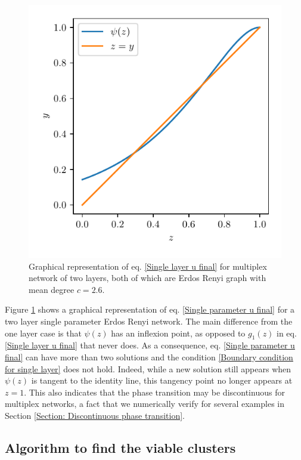 \documentclass[
11pt, %
english, %
singlespacing, %
nolistspacing, %
liststotoc, %
headsepline, %
]{MastersDoctoralThesis} %
\begin{document}
\begin{figure}
	\includegraphics[scale=1]{single_param_u_solution_graphically.pdf}
	\caption{Graphical representation of eq. \eqref{Single layer u final} for multiplex network of two layers, both of which are Erdos Renyi graph with mean degree $c = 2.6$.}
	\label{Figure: Solution of u = psi(u) graphically for single param}
\end{figure}

Figure \ref{Figure: Solution of u = psi(u) graphically for single param} shows a graphical representation of eq. \eqref{Single parameter u final} for a two layer single parameter Erdos Renyi network. The main difference from the one layer case is that $\psi(z)$ has an inflexion point, as opposed to $g_1(z)$ in eq. \eqref{Single layer u final} that never does. As a consequence, eq. \eqref{Single parameter u final} can have more than two solutions and the condition \eqref{Boundary condition for single layer} does not hold. Indeed, while a new solution still appears when $\psi(z)$ is tangent to the identity line, this tangency point no longer appears at $z = 1$. This also indicates that the phase transition may be discontinuous for multiplex networks, a fact that we numerically verify for several examples in Section \ref{Section: Discontinuous phase transition}.

\subsection{Algorithm to find the viable clusters}
\label{Section: Algorithm to find the GVC}
\end{document}
